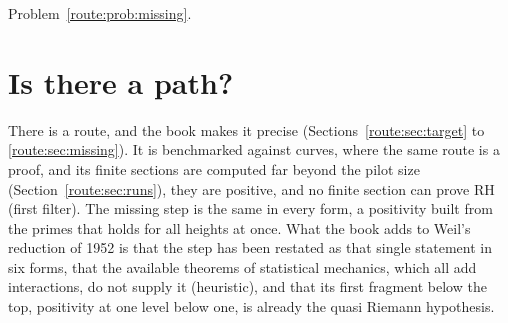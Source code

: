 \begin{problem}\label{route:prob:rh}
Problem~\ref{route:prob:missing}.
\end{problem}

\section{Is there a path?}\label{route:sec:answer}

There is a route, and the book makes it precise (Sections~\ref{route:sec:target} to \ref{route:sec:missing}). It is benchmarked against curves, where the same route is a proof, and its finite sections are computed far beyond the pilot size (Section~\ref{route:sec:runs}), they are positive, and no finite section can prove RH (first filter). The missing step is the same in every form, a positivity built from the primes that holds for all heights at once. What the book adds to Weil's reduction of 1952 is that the step has been restated as that single statement in six forms, that the available theorems of statistical mechanics, which all add interactions, do not supply it (heuristic), and that its first fragment below the top, positivity at one level below one, is already the quasi Riemann hypothesis.

